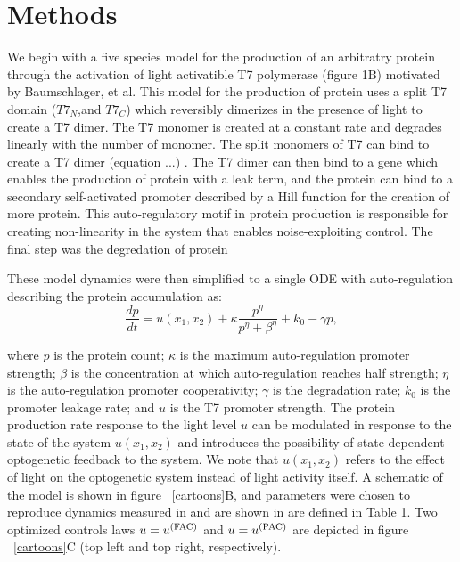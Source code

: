 \documentclass[12pt]{article}
\begin{document}
\section{Methods}
We begin with a five species model for the production of an arbitratry protein through the activation of light activatible T7 polymerase (figure 1B) motivated by Baumschlager, et al.
This model for the production of protein uses a split T7 domain ($T7_N$,and $T7_C$) which reversibly dimerizes in the presence of light to create a T7 dimer. The T7 monomer is created at a constant rate and degrades linearly with the number of monomer. The split monomers of T7 can bind to create a T7 dimer (equation ...) . The T7 dimer can then bind to a gene which enables the production of protein with a leak term, and the protein can bind to a secondary self-activated promoter described by a Hill function for the creation of more protein. This auto-regulatory motif in protein production is responsible for creating non-linearity in the system that enables noise-exploiting control. The final step was the degredation of protein 

These model dynamics were then simplified to a single ODE with auto-regulation describing the protein accumulation as: 
\begin{equation}
\frac{dp}{dt}=u(x_1,x_2)  + \kappa\frac{p^\eta}{p^\eta+\beta^\eta}+ k_0 -\gamma p,
\label{rateeq}
\end{equation}

where $p$ is the protein count; $\kappa$ is the maximum auto-regulation promoter strength; $\beta$ is the concentration at which auto-regulation reaches half strength; $\eta$ is the auto-regulation promoter cooperativity; $\gamma$ is the degradation rate; $k_0$ is the promoter leakage rate; and $u$ is the T7 promoter strength.  The protein production rate response to the light level $u$ can be modulated in response to the state of the system $u(x_1,x_2)$ and introduces the possibility of state-dependent optogenetic feedback to the system.  We note that $u(x_1,x_2)$ refers to the effect of light on the optogenetic system instead of light activity itself. A schematic of the model is shown in figure \ \ref{cartoons}B, and parameters were chosen to reproduce dynamics measured in \cite{Baumschlager2017} and are shown in are defined in Table 1\cite{May2021}. Two optimized controls laws $u=u^{\rm (FAC)}$ and $u=u^{\rm (PAC)}$ are depicted in figure \ \ref{cartoons}C (top left and top right, respectively).
\end{document}

